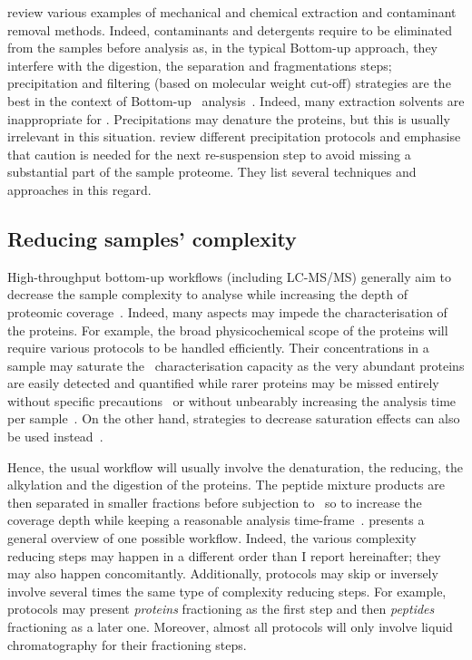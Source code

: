 \citet{Gutstein2008,Bodzon-Kulakowska2007,Visser2005,Hilbrig2003} review various
examples of mechanical and chemical extraction and contaminant removal methods.
Indeed, contaminants and detergents require to be eliminated from the samples
before analysis as, in the typical \gls{Bottom-up} approach, they interfere
with the digestion, the separation and fragmentations steps; precipitation and
filtering (based on molecular weight cut-off) strategies are the best in the
context of \gls{Bottom-up} \ms\ analysis~. Indeed, many
extraction solvents are inappropriate for \ms. Precipitations may denature the
proteins, but this is usually irrelevant in this situation.
\citet{Feist2015} review different precipitation protocols
and emphasise that caution is needed
for the next re-suspension step to avoid missing a substantial part of the
sample proteome. They list several techniques and approaches in this regard.\mybr\

\subsection{Reducing samples' complexity}\label{subsec:simpleProt}

High-throughput bottom-up workflows (including \gls{LC-MS/MS}) generally
aim to decrease the sample complexity to analyse while increasing the depth
of proteomic coverage~. Indeed,
many aspects may impede the characterisation of the proteins.
For example, the broad physicochemical scope of the proteins will
require various protocols to be handled efficiently.
Their concentrations in a sample may saturate the \ms\ characterisation capacity
as the very abundant proteins are easily detected and quantified while rarer
proteins may be missed entirely without specific precautions~ or without unbearably increasing the
analysis time per sample~.
On the other hand, strategies to decrease saturation effects can also be used
instead~.\mybr\

Hence, the usual workflow will usually involve the denaturation, the reducing,
the alkylation and the digestion of the proteins. The peptide mixture products
are then separated in smaller fractions before subjection to \ms\ so to increase
the coverage depth
while keeping a reasonable analysis time-frame~.
 presents a general overview of one possible workflow.
Indeed, the various complexity reducing steps may happen in a different order
than I report hereinafter; they may also happen concomitantly. Additionally,
protocols may skip or inversely involve several times the same type of
complexity reducing steps. For example, protocols may present
\emph{proteins} fractioning as the first step
and then \emph{peptides} fractioning as a later one.
Moreover, almost all protocols will only involve liquid chromatography for
their fractioning steps.\mybr\

